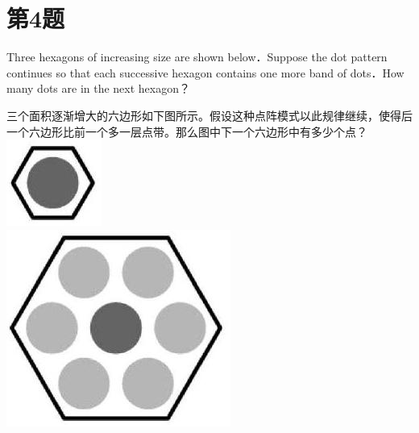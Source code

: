 \documentclass[10pt]{article}
\begin{document}
\section*{第4题}
Three hexagons of increasing size are shown below．Suppose the dot pattern continues so that each successive hexagon contains one more band of dots．How many dots are in the next hexagon？

三个面积逐渐增大的六边形如下图所示。假设这种点阵模式以此规律继续，使得后一个六边形比前一个多一层点带。那么图中下一个六边形中有多少个点？\\
\includegraphics[max width=\textwidth, center]{2025_09_05_48544237b06df716137eg-02}\\
\includegraphics[max width=\textwidth, center]{2025_09_05_48544237b06df716137eg-02(2)}\\
\end{document}
